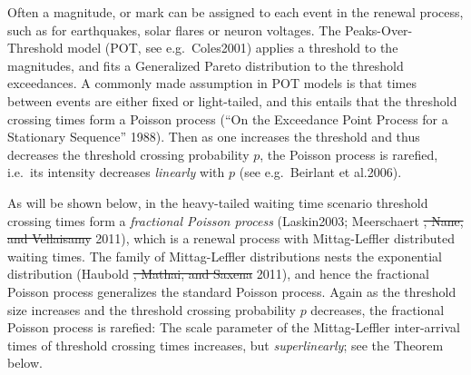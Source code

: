 \documentclass[]{elsarticle} %
\providecommand{\DIFaddtex}[1]{{\protect\color{blue}\uwave{#1}}} %
\providecommand{\DIFdeltex}[1]{{\protect\color{red}\sout{#1}}}                      %
\providecommand{\DIFaddbegin}{} %
\providecommand{\DIFaddend}{} %
\providecommand{\DIFdelbegin}{} %
\providecommand{\DIFdelend}{} %
\providecommand{\DIFadd}[1]{\texorpdfstring{\DIFaddtex{#1}}{#1}} %
\providecommand{\DIFdel}[1]{\texorpdfstring{\DIFdeltex{#1}}{}} %
\newcommand{\DIFscaledelfig}{0.5}
\newlength{\DIFdelgraphicswidth} %
\newlength{\DIFdelgraphicsheight} %
\newcommand{\DIFaddincludegraphics}[2][]{{\color{blue}\fbox{\DIFOincludegraphics[#1]{#2}}}} %
\newcommand{\DIFdelincludegraphics}[2][]{%
\sbox{\DIFdelgraphicsbox}{\DIFOincludegraphics[#1]{#2}}%
\settoboxwidth{\DIFdelgraphicswidth}{\DIFdelgraphicsbox} %
\settoboxtotalheight{\DIFdelgraphicsheight}{\DIFdelgraphicsbox} %
\scalebox{\DIFscaledelfig}{%
\parbox[b]{\DIFdelgraphicswidth}{\usebox{\DIFdelgraphicsbox}\\[-\baselineskip] \rule{\DIFdelgraphicswidth}{0em}}\llap{\resizebox{\DIFdelgraphicswidth}{\DIFdelgraphicsheight}{%
\setlength{\unitlength}{\DIFdelgraphicswidth}%
\begin{picture}(1,1)%
\thicklines\linethickness{2pt} %
{\color[rgb]{1,0,0}\put(0,0){\framebox(1,1){}}}%
{\color[rgb]{1,0,0}\put(0,0){\line( 1,1){1}}}%
{\color[rgb]{1,0,0}\put(0,1){\line(1,-1){1}}}%
\end{picture}%
}\hspace*{3pt}}} %
} %
\DeclareRobustCommand{\DIFaddbegin}{\DIFOaddbegin \let\includegraphics\DIFaddincludegraphics} %
\DeclareRobustCommand{\DIFaddend}{\DIFOaddend \let\includegraphics\DIFOincludegraphics} %
\DeclareRobustCommand{\DIFdelbegin}{\DIFOdelbegin \let\includegraphics\DIFdelincludegraphics} %
\DeclareRobustCommand{\DIFdelend}{\DIFOaddend \let\includegraphics\DIFOincludegraphics} %
\begin{document}
Often a magnitude, or mark can be assigned to each event in the renewal
process, such as for earthquakes, solar flares or neuron voltages. The
Peaks-Over-Threshold model (POT, see e.g.~Coles\DIFaddbegin \DIFadd{, }\DIFaddend 2001) applies a
threshold to the magnitudes, and fits a Generalized Pareto distribution
to the threshold exceedances. A commonly made assumption in POT models
is that times between events are either fixed or light-tailed, and this
entails that the threshold crossing times form a Poisson process (``On
the Exceedance Point Process for a Stationary Sequence\DIFaddbegin \DIFadd{,}\DIFaddend '' 1988). Then as
one increases the threshold and thus decreases the threshold crossing
probability \DIFdelbegin \DIFdel{\(p\)}\DIFdelend \DIFaddbegin \DIFadd{\(p_{\ell}\)}\DIFaddend , the Poisson process is rarefied, i.e.~its
intensity decreases \emph{linearly} with \DIFdelbegin \DIFdel{\(p\) }\DIFdelend \DIFaddbegin \DIFadd{\(p_{\ell}\) }\DIFaddend (see e.g.~Beirlant
et al.\DIFaddbegin \DIFadd{, }\DIFaddend 2006).

As will be shown below, in the heavy-tailed waiting time scenario
threshold crossing times form a \emph{fractional Poisson process}
(Laskin\DIFaddbegin \DIFadd{, }\DIFaddend 2003; Meerschaert \DIFdelbegin \DIFdel{, Nane, and Vellaisamy }\DIFdelend \DIFaddbegin \DIFadd{et al., }\DIFaddend 2011), which is a renewal process
with Mittag-Leffler distributed waiting times. The family of
Mittag-Leffler distributions nests the exponential distribution (Haubold
\DIFdelbegin \DIFdel{, Mathai, and Saxena }\DIFdelend \DIFaddbegin \DIFadd{et al., }\DIFaddend 2011), and hence the fractional Poisson process generalizes the
standard Poisson process. Again as the threshold size increases and the
threshold crossing probability \DIFdelbegin \DIFdel{\(p\) }\DIFdelend \DIFaddbegin \DIFadd{\(p_{\ell}\) }\DIFaddend decreases, the fractional
Poisson process is rarefied: The scale parameter of the Mittag-Leffler
inter-arrival times of threshold crossing times increases, but
\emph{superlinearly}; see the Theorem below.
\end{document}
